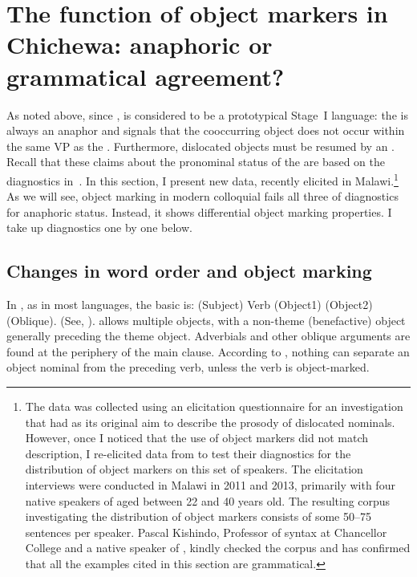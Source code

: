 \documentclass[output=paper]{LSP/langsci}
\begin{document}
\section{The function of object markers in Chichewa: anaphoric or grammatical agreement?}\label{02-do-sec:3}

As noted above, since \citet{Bresnanetal1987Topic},  is considered to be a prototypical Stage~I language: the  is always an anaphor and signals that the cooccurring object does not occur within the same VP as the . 
Furthermore, dislocated objects must be resumed by an . 
Recall that these claims about the pronominal status of the  are based on the diagnostics in~. 
In this section, I present new  data, recently elicited in Malawi.\footnote{The data was collected using an elicitation questionnaire for an investigation that had as its original aim to describe the prosody of dislocated nominals.
However, once I noticed that the use of object markers did not match  description, I re-elicited data from \citet{Bresnanetal1987Topic} to test their diagnostics for the distribution of object markers on this set of speakers. 
The elicitation interviews were conducted in Malawi in 2011 and 2013, primarily with four native speakers of  aged between 22 and 40 years old. 
The resulting corpus investigating the distribution of object markers consists of some 50–75 sentences per speaker. 
Pascal Kishindo, Professor of  syntax at Chancellor College and a native speaker of , kindly checked the corpus and has confirmed that all the examples cited in this section are grammatical.} 
As we will see, object marking in modern colloquial  fails all three of  diagnostics for anaphoric status. 
Instead, it shows differential object marking properties. 
I take up  diagnostics one by one below.

\subsection{Changes in word order and object marking}\label{02-do-sec:3-1}

In , as in most  languages, the basic  is: (Subject) Verb (Object1) (Object2) (Oblique). 
(See, \eg \citealt{Heine1976Typology,Bearth2003Syntax, Downingetal2016Information}). 
 allows multiple objects, with a non-theme (\eg benefactive) object generally preceding the theme object.
Adverbials and other oblique arguments are found at the periphery of the main clause. 
According to \citet{Mchombo2004Syntax}, nothing can separate an object nominal from the preceding verb, unless the verb is object-marked.
\end{document}

